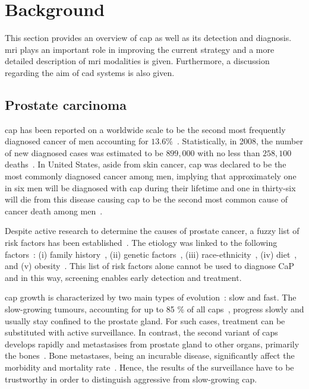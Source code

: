\section{Background} \label{sec:background}
This section provides an overview of \ac{cap} as well as its detection and diagnosis. \ac{mri} plays an important role in improving the current strategy and a more detailed description of \ac{mri} modalities is given. Furthermore, a discussion regarding the aim of \ac{cad} systems is also given.

\subsection{Prostate carcinoma}\label{subsec:procar}

\ac{cap} has been reported on a worldwide scale to be the second most frequently diagnosed cancer of men accounting for $13.6 \%$~\cite{Ferlay2010}. Statistically, in 2008, the number of new diagnosed cases was estimated to be $899,000$ with no less than $258,100$ deaths~\cite{Ferlay2010}. In United States, aside from skin cancer, \ac{cap} was declared to be the most commonly diagnosed cancer among men, implying that approximately one in six men will be diagnosed with \ac{cap} during their lifetime and one in thirty-six will die from this disease causing \ac{cap} to be the second most common cause of cancer death among men~\cite{Siegel2013,Society2013}.

Despite active research to determine the causes of prostate cancer, a fuzzy list of risk factors has been established~\cite{Society2010}. The etiology was linked to the following factors~\cite{Society2010}: (i) family history~\cite{Giovannucci2007,Steinberg1990}, (ii) genetic factors~\cite{Freedman2006,Amundadottir2006,Agalliu2009}, (iii) race-ethnicity~\cite{Giovannucci2007,Hoffman2001}, (iv) diet~\cite{Giovannucci2007,Ma2009,Alexander2010}, and (v) obesity~\cite{Giovannucci2007,Rodriguez2007}. This list of risk factors alone cannot be used to diagnose CaP and in this way, screening enables early detection and treatment.

\ac{cap} growth is characterized by two main types of evolution~\cite{Strum2005}: slow and fast. The slow-growing tumours, accounting for up to 85 \% of all \acp{cap}~\cite{Lu-Yao2009}, progress slowly and usually stay confined to the prostate gland. For such cases, treatment can be substituted with active surveillance. In contrast, the second variant of \acp{cap} develops rapidly and metastasises from prostate gland to other organs, primarily the bones~\cite{Oster2013}. Bone metastases, being an incurable disease, significantly affect the morbidity and mortality rate~\cite{Ye2007}. Hence, the  results of the surveillance have to be trustworthy in order to distinguish aggressive from slow-growing \ac{cap}.

